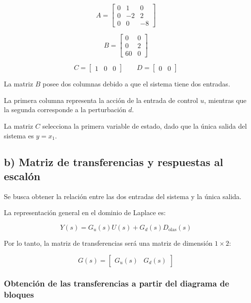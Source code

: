 \documentclass[12pt,a4paper]{article}
\begin{document}
\begin{equation}\boxed{A=\begin{bmatrix}0&1&0\\0&-2&2\\0&0&-8\end{bmatrix}}\end{equation}

\begin{equation}\boxed{B=\begin{bmatrix}0&0\\0&2\\60&0\end{bmatrix}}\end{equation}

\begin{equation}\boxed{C=\begin{bmatrix}1&0&0\end{bmatrix} \qquad D=\begin{bmatrix}0&0\end{bmatrix}}\end{equation}

La matriz $B$ posee dos columnas debido a que el sistema tiene dos entradas.

La primera columna representa la acción de la entrada de control $u$, mientras que la segunda corresponde a la perturbación $d$.

La matriz $C$ selecciona la primera variable de estado, dado que la única salida del sistema es $y=x_1$.
\subsection*{b) Matriz de transferencias y respuestas al escalón}
Se busca obtener la relación entre las dos entradas del sistema y la única salida.

La representación general en el dominio de Laplace es:

\begin{equation}Y(s)=G_u(s)U(s)+G_d(s)D_{\mathrm{olas}}(s)\end{equation}

Por lo tanto, la matriz de transferencias será una matriz de dimensión $1\times2$:

\begin{equation}G(s)=\begin{bmatrix}G_u(s)&G_d(s)\end{bmatrix}\end{equation}
\subsubsection*{Obtención de las transferencias a partir del diagrama de bloques}
\end{document}
